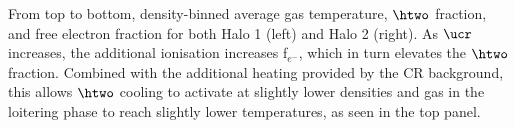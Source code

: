 \label{fig:efrac}
From top to bottom, density-binned average gas temperature, $\htwo$ fraction, and free electron fraction for both Halo 1 (left) and Halo 2  (right). As $\ucr$ increases, the additional ionisation increases f$_{e^-}$, which in turn elevates the $\htwo$ fraction. Combined with the additional heating provided by the CR background, this allows $\htwo$ cooling to activate at slightly lower densities and gas in the loitering phase to reach slightly lower temperatures, as seen in the top panel.